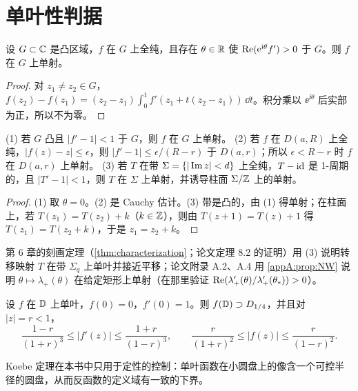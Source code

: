 \section{单叶性判据}\label{appA:sec:univalence}

\begin{proposition}\label{appA:prop:NW}
设 $G\subset\mathbb{C}$ 是凸区域，$f$ 在 $G$ 上全纯，且存在 $\theta\in\mathbb{R}$ 使 $\operatorname{Re}(\mathrm{e}^{\mathrm{i}\theta}f')>0$ 于 $G$。则 $f$ 在 $G$ 上单射。
\end{proposition}

\begin{proof}
对 $z_1\neq z_2\in G$，$f(z_2)-f(z_1)=(z_2-z_1)\int_0^1f'(z_1+t(z_2-z_1))\,\dd t$。积分乘以 $\ee^{\ii\theta}$ 后实部为正，所以不为零。
\end{proof}

\begin{corollary}\label{appA:cor:near-id}
(1) 若 $G$ 凸且 $|f'-1|<1$ 于 $G$，则 $f$ 在 $G$ 上单射。
(2) 若 $f$ 在 $D(a,R)$ 上全纯，$|f(z)-z|\le\epsilon$，则 $|f'-1|\le\epsilon/(R-r)$ 于 $D(a,r)$；所以 $\epsilon<R-r$ 时 $f$ 在 $D(a,r)$ 上单射。
(3) 若 $T$ 在带 $\Sigma=\{|\operatorname{Im} z|<d\}$ 上全纯，$T-\mathrm{id}$ 是 1-周期的，且 $|T'-1|<1$，则 $T$ 在 $\Sigma$ 上单射，并诱导柱面 $\Sigma/\mathbb{Z}$ 上的单射。
\end{corollary}

\begin{proof}
(1) 取 $\theta=0$。(2) 是 Cauchy 估计。(3) 带是凸的，由 (1) 得单射；在柱面上，若 $T(z_1)=T(z_2)+k$（$k\in\mathbb{Z}$），则由 $T(z+1)=T(z)+1$ 得 $T(z_1)=T(z_2+k)$，于是 $z_1=z_2+k$。
\end{proof}

第 6 章的刻画定理（\cref{thm:characterization}；论文定理 8.2 的证明）用 (3) 说明转移映射 $T$ 在带 $\Sigma_q$ 上单叶并接近平移；论文附录 A.2、A.4 用 \cref{appA:prop:NW}
说明 $\theta\mapsto\lambda_+(\theta)$ 在给定矩形上单射（在那里验证 $\operatorname{Re}(\lambda_+'(\theta)/\lambda_+'(\theta_*))>0$）。

\begin{theorem}\label{appA:thm:koebe}
设 $f$ 在 $\mathbb{D}$ 上单叶，$f(0)=0$，$f'(0)=1$。则 $f(\mathbb{D})\supset D_{1/4}$，并且对 $|z|=r<1$，
\[
  \frac{1-r}{(1+r)^3}\le|f'(z)|\le\frac{1+r}{(1-r)^3},\qquad \frac{r}{(1+r)^2}\le|f(z)|\le\frac{r}{(1-r)^2}.
\]
\end{theorem}

Koebe 定理在本书中只用于定性的控制：单叶函数在小圆盘上的像含一个可控半径的圆盘，从而反函数的定义域有一致的下界。

